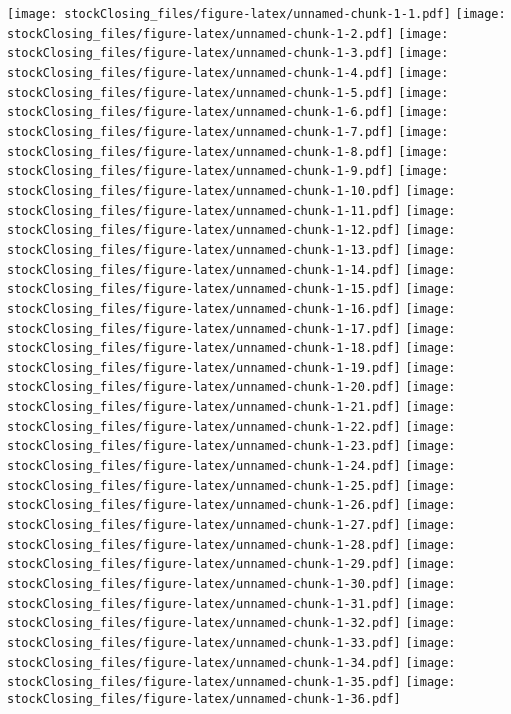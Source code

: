 \documentclass[]{article}
\begin{document}
\texttt{[image: stockClosing\_files/figure-latex/unnamed-chunk-1-1.pdf]}
\texttt{[image: stockClosing\_files/figure-latex/unnamed-chunk-1-2.pdf]}
\texttt{[image: stockClosing\_files/figure-latex/unnamed-chunk-1-3.pdf]}
\texttt{[image: stockClosing\_files/figure-latex/unnamed-chunk-1-4.pdf]}
\texttt{[image: stockClosing\_files/figure-latex/unnamed-chunk-1-5.pdf]}
\texttt{[image: stockClosing\_files/figure-latex/unnamed-chunk-1-6.pdf]}
\texttt{[image: stockClosing\_files/figure-latex/unnamed-chunk-1-7.pdf]}
\texttt{[image: stockClosing\_files/figure-latex/unnamed-chunk-1-8.pdf]}
\texttt{[image: stockClosing\_files/figure-latex/unnamed-chunk-1-9.pdf]}
\texttt{[image: stockClosing\_files/figure-latex/unnamed-chunk-1-10.pdf]}
\texttt{[image: stockClosing\_files/figure-latex/unnamed-chunk-1-11.pdf]}
\texttt{[image: stockClosing\_files/figure-latex/unnamed-chunk-1-12.pdf]}
\texttt{[image: stockClosing\_files/figure-latex/unnamed-chunk-1-13.pdf]}
\texttt{[image: stockClosing\_files/figure-latex/unnamed-chunk-1-14.pdf]}
\texttt{[image: stockClosing\_files/figure-latex/unnamed-chunk-1-15.pdf]}
\texttt{[image: stockClosing\_files/figure-latex/unnamed-chunk-1-16.pdf]}
\texttt{[image: stockClosing\_files/figure-latex/unnamed-chunk-1-17.pdf]}
\texttt{[image: stockClosing\_files/figure-latex/unnamed-chunk-1-18.pdf]}
\texttt{[image: stockClosing\_files/figure-latex/unnamed-chunk-1-19.pdf]}
\texttt{[image: stockClosing\_files/figure-latex/unnamed-chunk-1-20.pdf]}
\texttt{[image: stockClosing\_files/figure-latex/unnamed-chunk-1-21.pdf]}
\texttt{[image: stockClosing\_files/figure-latex/unnamed-chunk-1-22.pdf]}
\texttt{[image: stockClosing\_files/figure-latex/unnamed-chunk-1-23.pdf]}
\texttt{[image: stockClosing\_files/figure-latex/unnamed-chunk-1-24.pdf]}
\texttt{[image: stockClosing\_files/figure-latex/unnamed-chunk-1-25.pdf]}
\texttt{[image: stockClosing\_files/figure-latex/unnamed-chunk-1-26.pdf]}
\texttt{[image: stockClosing\_files/figure-latex/unnamed-chunk-1-27.pdf]}
\texttt{[image: stockClosing\_files/figure-latex/unnamed-chunk-1-28.pdf]}
\texttt{[image: stockClosing\_files/figure-latex/unnamed-chunk-1-29.pdf]}
\texttt{[image: stockClosing\_files/figure-latex/unnamed-chunk-1-30.pdf]}
\texttt{[image: stockClosing\_files/figure-latex/unnamed-chunk-1-31.pdf]}
\texttt{[image: stockClosing\_files/figure-latex/unnamed-chunk-1-32.pdf]}
\texttt{[image: stockClosing\_files/figure-latex/unnamed-chunk-1-33.pdf]}
\texttt{[image: stockClosing\_files/figure-latex/unnamed-chunk-1-34.pdf]}
\texttt{[image: stockClosing\_files/figure-latex/unnamed-chunk-1-35.pdf]}
\texttt{[image: stockClosing\_files/figure-latex/unnamed-chunk-1-36.pdf]}
\end{document}
